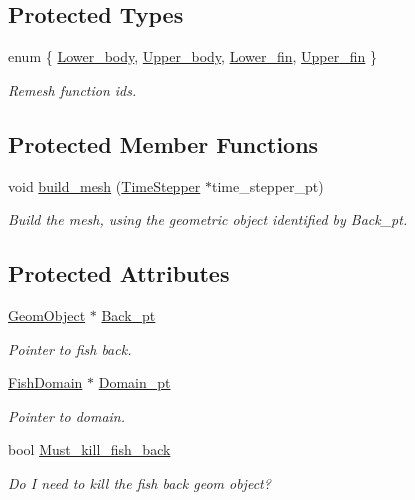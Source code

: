 \subsection*{Protected Types}
\begin{DoxyCompactItemize}
\item 
enum \{ \hyperlink{classoomph_1_1FishMesh_a3b60ba4a8b5b7efe9f6f91846bd484eba3d3771209da5e9d30eedf957678f24fb}{Lower\+\_\+body}, 
\hyperlink{classoomph_1_1FishMesh_a3b60ba4a8b5b7efe9f6f91846bd484ebaee1779e3610fcc506554edb97df12b81}{Upper\+\_\+body}, 
\hyperlink{classoomph_1_1FishMesh_a3b60ba4a8b5b7efe9f6f91846bd484eba616ba7504cd0d8970e1e275579f5606d}{Lower\+\_\+fin}, 
\hyperlink{classoomph_1_1FishMesh_a3b60ba4a8b5b7efe9f6f91846bd484eba773d3896b889d4f05ed5902482650da1}{Upper\+\_\+fin}
 \}\begin{DoxyCompactList}\small\item\em Remesh function ids. \end{DoxyCompactList}
\end{DoxyCompactItemize}
\subsection*{Protected Member Functions}
\begin{DoxyCompactItemize}
\item 
void \hyperlink{classoomph_1_1FishMesh_aabde81364817d938f0924997bf4f63cc}{build\+\_\+mesh} (\hyperlink{classoomph_1_1TimeStepper}{Time\+Stepper} $\ast$time\+\_\+stepper\+\_\+pt)
\begin{DoxyCompactList}\small\item\em Build the mesh, using the geometric object identified by Back\+\_\+pt. \end{DoxyCompactList}\end{DoxyCompactItemize}
\subsection*{Protected Attributes}
\begin{DoxyCompactItemize}
\item 
\hyperlink{classoomph_1_1GeomObject}{Geom\+Object} $\ast$ \hyperlink{classoomph_1_1FishMesh_a26e8eb98c11d6b45cc3b5c5a8e45b530}{Back\+\_\+pt}
\begin{DoxyCompactList}\small\item\em Pointer to fish back. \end{DoxyCompactList}\item 
\hyperlink{classoomph_1_1FishDomain}{Fish\+Domain} $\ast$ \hyperlink{classoomph_1_1FishMesh_ae18c3154ad99054c073840c6b134c49b}{Domain\+\_\+pt}
\begin{DoxyCompactList}\small\item\em Pointer to domain. \end{DoxyCompactList}\item 
bool \hyperlink{classoomph_1_1FishMesh_ad1dd5a431f711d3ac14498cc6ab4d856}{Must\+\_\+kill\+\_\+fish\+\_\+back}
\begin{DoxyCompactList}\small\item\em Do I need to kill the fish back geom object? \end{DoxyCompactList}\end{DoxyCompactItemize}
